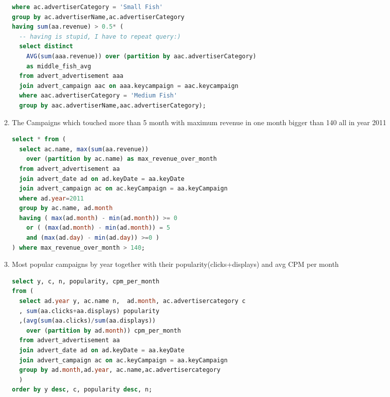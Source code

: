 \begin{enumerate}
\begin{lstlisting}[language=sql]
where ac.advertiserCategory = 'Small Fish'
group by ac.advertiserName,ac.advertiserCategory
having sum(aa.revenue) > 0.5* (
  -- having is stupid, I have to repeat query:)
  select distinct
    AVG(sum(aaa.revenue)) over (partition by aac.advertiserCategory) 
    as middle_fish_avg
  from advert_advertisement aaa 
  join advert_campaign aac on aaa.keycampaign = aac.keycampaign
  where aac.advertiserCategory = 'Medium Fish'   
  group by aac.advertiserName,aac.advertiserCategory);
  \end{lstlisting}
\item    The Campaigns which touched more than 5 month with maximum revenue in one month bigger than 140 all in year 2011 
  \begin{lstlisting}[language=sql] 
select * from (
  select ac.name, max(sum(aa.revenue)) 
    over (partition by ac.name) as max_revenue_over_month
  from advert_advertisement aa
  join advert_date ad on ad.keyDate = aa.keyDate
  join advert_campaign ac on ac.keyCampaign = aa.keyCampaign
  where ad.year=2011
  group by ac.name, ad.month
  having ( max(ad.month) - min(ad.month)) >= 0 
    or ( (max(ad.month) - min(ad.month)) = 5 
    and (max(ad.day) - min(ad.day)) >=0 )
) where max_revenue_over_month > 140;
  \end{lstlisting}
\item Most popular campaigns by year together with their popularity(clicks+displays) and  avg CPM per month
  \begin{lstlisting}[language=sql] 
select y, c, n, popularity, cpm_per_month
from (
  select ad.year y, ac.name n,  ad.month, ac.advertisercategory c
  , sum(aa.clicks+aa.displays) popularity
  ,(avg(sum(aa.clicks)/sum(aa.displays)) 
    over (partition by ad.month)) cpm_per_month 
  from advert_advertisement aa
  join advert_date ad on ad.keyDate = aa.keyDate
  join advert_campaign ac on ac.keyCampaign = aa.keyCampaign
  group by ad.month,ad.year, ac.name,ac.advertisercategory
  )
order by y desc, c, popularity desc, n;

  \end{lstlisting}
\end{enumerate}

